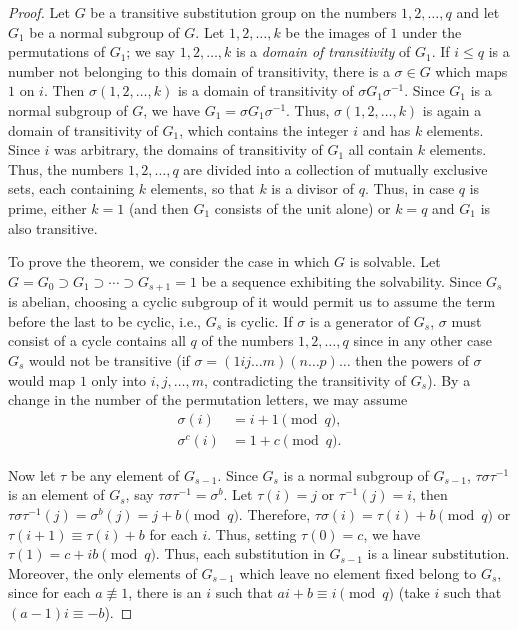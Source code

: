 \documentclass[10pt,leqno,a5paper]{book}
\theoremstyle{definition}
\begin{document}
\begin{proof}
Let $G$ be a transitive substitution group on the numbers $1,2,\ldots,q$ and let $G_1$ be a normal subgroup of $G$.
Let $1,2,\ldots,k$ be the images of $1$ under the permutations of $G_1$; we say $1,2,\ldots,k$ is a \emph{domain of transitivity} of $G_1$.
If $i \leq q$ is a number not belonging to this domain of transitivity, there is a $\sigma \in G$ which maps $1$ on $i$.
Then $\sigma(1,2,\ldots,k)$ is a domain of transitivity of $\sigma G_1 \sigma^{-1}$.
Since $G_1$ is a normal subgroup of $G$, we have $G_1 = \sigma G_1 \sigma^{-1}$.
Thus, $\sigma(1,2,\ldots,k)$ is again a domain of transitivity of $G_1$, which contains the integer $i$ and has $k$ elements.
Since $i$ was arbitrary, the domains of transitivity of $G_1$ all contain $k$ elements.
Thus, the numbers $1,2,\ldots,q$ are divided into a collection of mutually exclusive sets, each containing $k$ elements, so that $k$ is a divisor of $q$.
Thus, in case $q$ is prime, either $k = 1$ (and then $G_1$ consists of the unit alone) or $k = q$ and $G_1$ is also transitive.

To prove the theorem, we consider the case in which $G$ is solvable.
Let $G = G_0 \supset G_1 \supset \cdots \supset G_{s+1} = 1$ be a sequence exhibiting the solvability.
Since $G_s$ is abelian, choosing a cyclic subgroup of it would permit us to assume the term before the last to be cyclic, i.e., $G_s$ is cyclic.
If $\sigma$ is a generator of $G_s$, $\sigma$ must consist of a cycle contains all $q$ of the numbers $1,2,\ldots,q$ since in any other case $G_s$ would not be transitive (if $\sigma = (1ij\ldots m)(n \ldots p)\ldots$ then the powers of $\sigma$ would map $1$ only into $i,j,\ldots,m$, contradicting the transitivity of $G_s$).
By a change in the number of the permutation letters, we may assume
\begin{align*}
\sigma(i) &= i + 1 \pmod q,
\\
\sigma^c(i) &= 1 + c \pmod q.
\end{align*}

Now let $\tau$ be any element of $G_{s-1}$.
Since $G_s$ is a normal subgroup of $G_{s-1}$, $\tau \sigma \tau^{-1}$ is an element of $G_s$, say $\tau \sigma \tau^{-1} = \sigma^b$.
Let $\tau(i) = j$ or $\tau^{-1}(j) = i$, then $\tau \sigma \tau^{-1}(j) = \sigma^b(j) = j + b \pmod q$.
Therefore, $\tau\sigma(i) = \tau(i) + b \pmod q$ or $\tau(i+1) \equiv \tau(i) + b$ for each $i$.
Thus, setting $\tau(0) = c$, we have $\tau(1) = c + ib \pmod q$.
Thus, each substitution in $G_{s-1}$ is a linear substitution.
Moreover, the only elements of $G_{s-1}$ which leave no element fixed belong to $G_s$, since for each $a \not\equiv 1$, there is an $i$ such that $ai + b \equiv i \pmod q$ (take $i$ such that $(a-1)i \equiv -b$).


\end{proof}
\end{document}

